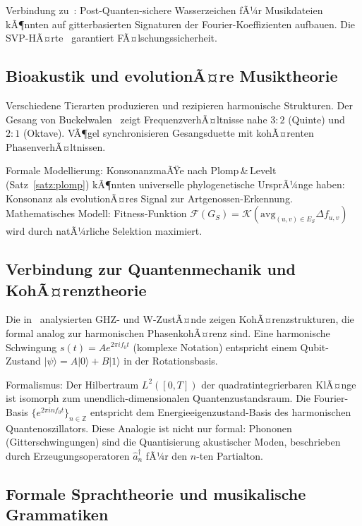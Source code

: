 ﻿\documentclass[a4paper,12pt]{article}
\theoremstyle{definition}
\begin{document}
Verbindung zu~\cite{epp2026pqc}: Post-Quanten-sichere Wasserzeichen fÃ¼r
Musikdateien kÃ¶nnten auf gitterbasierten Signaturen der Fourier-Koeffizienten
aufbauen. Die SVP-HÃ¤rte~\cite{epp2026lattice} garantiert FÃ¤lschungssicherheit.

\subsection{Bioakustik und evolutionÃ¤re Musiktheorie}

Verschiedene Tierarten produzieren und rezipieren harmonische Strukturen. Der
Gesang von Buckelwalen~\cite{epp2026whale} zeigt FrequenzverhÃ¤ltnisse nahe $3:2$
(Quinte) und $2:1$ (Oktave). VÃ¶gel synchronisieren Gesangsduette mit kohÃ¤renten
PhasenverhÃ¤ltnissen.

Formale Modellierung: KonsonanzmaÃŸe nach Plomp\,\&\,Levelt (Satz~\ref{satz:plomp})
kÃ¶nnten universelle phylogenetische UrsprÃ¼nge haben: Konsonanz als evolutionÃ¤res
Signal zur Artgenossen-Erkennung. Mathematisches Modell: Fitness-Funktion
$\mathcal{F}(G_S) = \mathcal{K}(\mathrm{avg}_{(u,v) \in E_S} \Delta f_{u,v})$
wird durch natÃ¼rliche Selektion maximiert.

\subsection{Verbindung zur Quantenmechanik und KohÃ¤renztheorie}

Die in~\cite{epp2026quantum} analysierten GHZ- und W-ZustÃ¤nde zeigen
KohÃ¤renzstrukturen, die formal analog zur harmonischen PhasenkohÃ¤renz sind.
Eine harmonische Schwingung $s(t) = A e^{2\pi i f_0 t}$ (komplexe Notation)
entspricht einem Qubit-Zustand $|\psi\rangle = A|0\rangle + B|1\rangle$ in der
Rotationsbasis.

Formalismus: Der Hilbertraum $L^2([0,T])$ der quadratintegrierbaren KlÃ¤nge
ist isomorph zum unendlich-dimensionalen Quantenzustandsraum. Die Fourier-Basis
$\{e^{2\pi i n f_0 t}\}_{n \in \mathbb{Z}}$ entspricht dem Energieeigenzustand-Basis
des harmonischen Quantenoszillators. Diese Analogie ist nicht nur formal:
Phononen (Gitterschwingungen) sind die Quantisierung akustischer Moden,
beschrieben durch Erzeugungsoperatoren $\hat{a}^\dagger_n$ fÃ¼r den $n$-ten
Partialton.

\subsection{Formale Sprachtheorie und musikalische Grammatiken}
\end{document}
